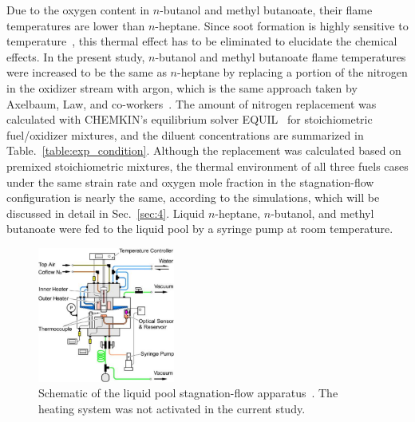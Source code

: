 \documentclass[review,3p,times]{elsarticleUS}
\begin{document}
Due to the oxygen content in $n$-butanol and methyl butanoate, their flame temperatures are lower than $n$-heptane. Since soot formation is highly sensitive to temperature~\cite{wang11}, this thermal effect has to be eliminated to elucidate the chemical effects. In the present study, $n$-butanol and methyl butanoate flame temperatures were increased to be the same as $n$-heptane by replacing a portion of the nitrogen in the oxidizer stream with argon, which is the same approach taken by Axelbaum, Law, and co-workers~\cite{du89,du91,axelbaum91}. The amount of nitrogen replacement was calculated with CHEMKIN's equilibrium solver EQUIL~\cite{chemkin} for stoichiometric fuel/oxidizer mixtures, and the diluent concentrations are summarized in Table.~\ref{table:exp_condition}.  Although the replacement was calculated based on premixed stoichiometric mixtures, the thermal environment of all three fuels cases under the same strain rate and oxygen mole fraction in the stagnation-flow configuration is nearly the same, according to the simulations, which will be discussed in detail in Sec.~\ref{sec:4}.  Liquid $n$-heptane, $n$-butanol, and methyl butanoate were fed to the liquid pool by a syringe pump at room temperature.

\begin{figure}[t]
  \centering
  \scriptsize
  \includegraphics[width=0.4\textwidth]{Setup.png}
  \normalsize
  \caption{Schematic of the liquid pool stagnation-flow apparatus~\cite{liu10}.  The heating system was not activated in the current study.}
  \label{fig:setup}
\end{figure}
\end{document}
